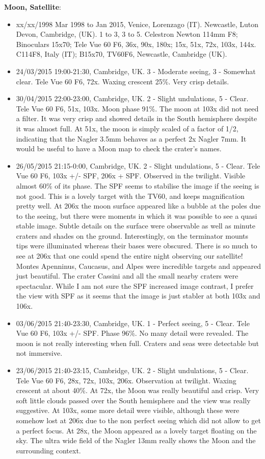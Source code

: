 {\bf Moon, Satellite}:
\begin{itemize}
\item xx/xx/1998 Mar 1998 to Jan 2015, Venice, Lorenzago (IT). Newcastle, Luton Devon, Cambridge, (UK). 1 to 3, 3 to 5. Celestron Newton 114mm F8; Binoculars 15x70; Tele Vue 60 F6, 36x, 90x, 180x; 15x, 51x, 72x, 103x, 144x. C114F8, Italy (IT); B15x70, TV60F6, Newcastle, Cambridge (UK).
\item 24/03/2015 19:00-21:30, Cambridge, UK. 3 - Moderate seeing, 3 - Somewhat clear. Tele Vue 60 F6, 72x. Waxing crescent 25\%. Very crisp details. 
\item 30/04/2015 22:00-23:00, Cambridge, UK. 2 - Slight undulations, 5 - Clear. Tele Vue 60 F6, 51x, 103x. Moon phase 91\%. The moon at 103x did not need a filter. It was very crisp and showed details in the South hemisphere despite it was almost full. At 51x, the moon is simply scaled of a factor of 1/2, indicating that the Nagler 3.5mm behaves as a perfect 2x Nagler 7mm. It would be useful to have a Moon map to check the crater's names. 
\item 26/05/2015 21:15-0:00, Cambridge, UK. 2 - Slight undulations, 5 - Clear. Tele Vue 60 F6, 103x +/- SPF, 206x + SPF. Observed in the twilight. Visible almost 60\% of its phase. The SPF seems to stabilise the image if the seeing is not good. This is a lovely target with the TV60, and keeps magnification pretty well. At 206x the moon surface appeared like a bubble at the poles due to the seeing, but there were moments in which it was possible to see a quasi stable image. Subtle details on the surface were observable as well as minute craters and shades on the ground. Interestingly, on the terminator mounts tips were illuminated whereas their bases were obscured. There is so much to see at 206x that one could spend the entire night observing our satellite! Montes Apenninus, Caucasus, and Alpes were incredible targets and appeared just beautiful. The crater Cassini and all the small nearby craters were spectacular. While I am not sure the SPF increased image contrast, I prefer the view with SPF as it seems that the image is just stabler at both 103x and 106x.
\item 03/06/2015 21:40-23:30, Cambridge, UK. 1 - Perfect seeing, 5 - Clear. Tele Vue 60 F6, 103x +/- SPF. Phase 96\%. No many detail were revealed. The moon is not really interesting when full. Craters and seas were detectable but not immersive. 
\item 23/06/2015 21:40-23:15, Cambridge, UK. 2 - Slight undulations, 5 - Clear. Tele Vue 60 F6, 28x, 72x, 103x, 206x. Observation at twilight. Waxing crescent at about 40\%. At 72x, the Moon was really beautiful and crisp. Very soft little clouds passed over the South hemisphere and the view was really suggestive. At 103x, some more detail were visible, although these were somehow lost at 206x due to the non perfect seeing which did not allow to get a perfect focus. At 28x, the Moon appeared as a lovely target floating on the sky. The ultra wide field of the Nagler 13mm really shows the Moon and the surrounding context.

\end{itemize}
